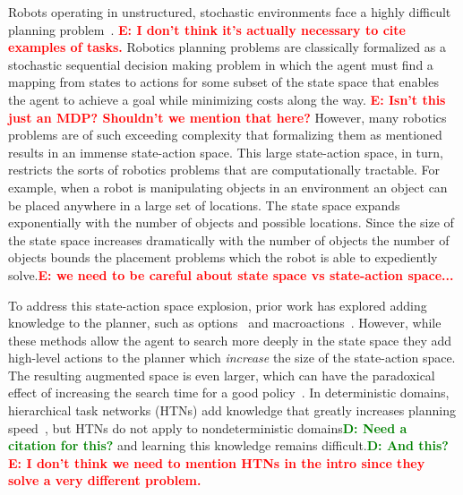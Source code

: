 \documentclass[conference]{IEEEtran}
\newcommand{\dnote}[1]{\textcolor{Green}{\textbf{D: #1}}}
\newcommand{\enote}[1]{\textcolor{Red}{\textbf{E: #1}}}
\begin{document}
Robots operating in unstructured, stochastic environments face a highly difficult planning problem~\citep{bollini12, knepper13}.
\enote{I don't think it's actually necessary to cite examples of tasks.}  Robotics planning problems are classically formalized as a stochastic sequential
decision making problem in which the agent must find a mapping from
states to actions for some subset of the state space that enables the
agent to achieve a goal while minimizing costs along the way. \enote{Isn't this just an MDP? Shouldn't we mention that here?}
However, many robotics problems are of such exceeding complexity that formalizing them as mentioned results in an immense state-action space. This large state-action space, in turn, restricts the sorts of robotics problems that are computationally tractable.
  For example, when a robot is manipulating objects in an environment
an object can be placed anywhere in a large set of locations. The
state space expands exponentially with the number of objects and
possible locations. Since the size of the state space increases dramatically with the number of objects the number of objects bounds the placement problems which the robot is able to expediently solve.\enote{we need to be careful about state space vs state-action space...}

To address this state-action space explosion, prior work has explored adding
knowledge to the planner,
such as options~\cite{sutton99} and
macroactions~\cite{Botea:2005kx,Newton:2005vn}. However, while these methods allow the agent to search more deeply in the state
space they add high-level actions to the planner which {\em increase} the size of the state-action space.  The resulting augmented space is even larger, which can have
the paradoxical effect of increasing the search time for a good
policy~\cite{Jong:2008zr}.  In deterministic domains, hierarchical
task networks (HTNs) add knowledge that greatly increases planning
speed~\citep{Nau:1999:SSH:1624312.1624357}, but HTNs do not apply
to nondeterministic domains\dnote{Need a citation for this?} and
learning this knowledge remains difficult.\dnote{And this?} \enote{I don't think we need to mention HTNs in the intro since they solve a very different problem.}

\end{document}
